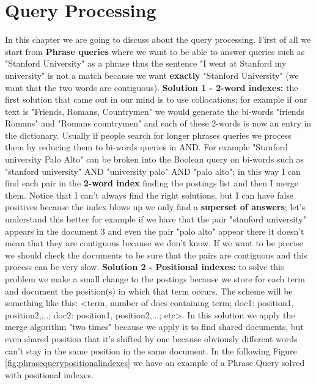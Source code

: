 \chapter{Query Processing}
In this chapter we are going to discuss about the query processing. First of all we start from \textbf{Phrase queries} where we want to be able to answer queries such as "Stanford University" as a phrase thus the sentence "I went at Stanford my university" is not a match because we want \textbf{exactly} "Stanford University" (we want that the two words are contiguous).\newline
\textbf{Solution 1 - 2-word indexes:} the first solution that came out in our mind is to use collocations; for example if our text is "Friends, Romans, Countrymen" we would generate the bi-words  "friends Romans" and "Romans countrymen" and each of these 2-words is now an entry in the dictionary.\newline
Usually if people search for longer phrases queries we process them by reducing them to bi-words queries in AND. For example "Stanford university Palo Alto" can be broken into the Boolean query on bi-words such as "stanford university" AND "university palo" AND "palo alto"; in this way I can find each pair in the \textbf{2-word index} finding the postings list and then I merge them. Notice that I can't always find the right solutions, but I can have false positives because the index blows up we only find a \textbf{superset of answers}; let's understand this better for example if we have that the pair "stanford university" appears in the document 3 and even the pair "palo alto" appear there it doesn't mean that they are contiguous because we don't know. If we want to be precise we should check the documents to be sure that the pairs are contiguous and this process can be very slow.\newline
\textbf{Solution 2 - Positional indexes:} to solve this problem we make a small change to the postings because we store for each term and document the position(s) in which that term occurs. The scheme will be something like this: <term, number of docs containing term; doc1: position1, position2,...; doc2: position1, position2,...; etc>. In this solution we apply the merge algorithm "two times" because we apply it to find shared documents, but even shared position that it's shifted by one because obviously different words can't stay in the same position in the same document.\newline
In the following Figure \ref{fig:phrasequerypositionalindexes} we have an example of a Phrase Query solved with positional indexes.\newline

